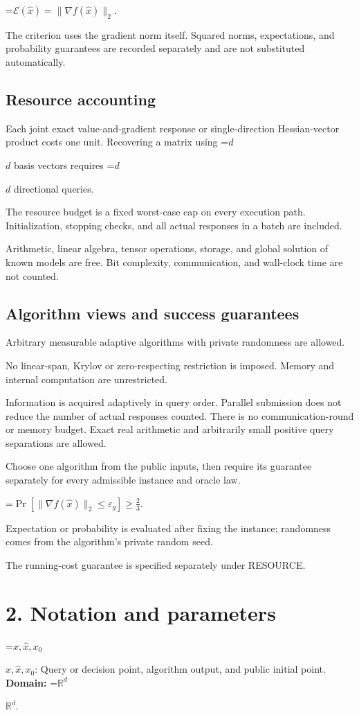 \documentclass[10pt,a4paper]{article}
\newcommand{\AtlasMath}[1]{\par\begingroup\centering\setbox0=\hbox{$\displaystyle #1$}\ifdim\wd0>1.4\linewidth\typeout{ATLAS WIDE FORMULA: \the\wd0}\fi\ifdim\wd0>\linewidth\resizebox{\linewidth}{!}{\box0}\else\box0\fi\par\endgroup}
\newcommand{\AtlasInlineMath}[1]{\begingroup\setbox0=\hbox{$#1$}\ifdim\wd0>.4\linewidth\endgroup\AtlasMath{#1}\else\endgroup$#1$\fi}
\begin{document}
\AtlasMath{\mathcal{E}(\widehat{x})=\|\nabla f(\widehat{x})\|_2.}


The criterion uses the gradient norm itself. Squared norms, expectations, and probability guarantees are recorded separately and are not substituted automatically.

\subsection{Resource accounting}
Each joint exact value-and-gradient response or single-direction Hessian-vector product costs one unit. Recovering a matrix using \AtlasInlineMath{d} basis vectors requires \AtlasInlineMath{d} directional queries.

The resource budget is a fixed worst-case cap on every execution path. Initialization, stopping checks, and all actual responses in a batch are included.

Arithmetic, linear algebra, tensor operations, storage, and global solution of known models are free. Bit complexity, communication, and wall-clock time are not counted.

\subsection{Algorithm views and success guarantees}
Arbitrary measurable adaptive algorithms with private randomness are allowed.

No linear-span, Krylov or zero-respecting restriction is imposed. Memory and internal computation are unrestricted.

Information is acquired adaptively in query order. Parallel submission does not reduce the number of actual responses counted. There is no communication-round or memory budget. Exact real arithmetic and arbitrarily small positive query separations are allowed.

Choose one algorithm from the public inputs, then require its guarantee separately for every admissible instance and oracle law.


\AtlasMath{\Pr\!\left[\|\nabla f(\widehat{x})\|_2\le \varepsilon_g\right]\ge\frac23.}


Expectation or probability is evaluated after fixing the instance; randomness comes from the algorithm's private random seed.

The running-cost guarantee is specified separately under RESOURCE.

\section{2. Notation and parameters}
\AtlasInlineMath{x,\widehat{x},x_0}: Query or decision point, algorithm output, and public initial point. \textbf{Domain:} \AtlasInlineMath{\mathbb{R}^d}.
\end{document}
